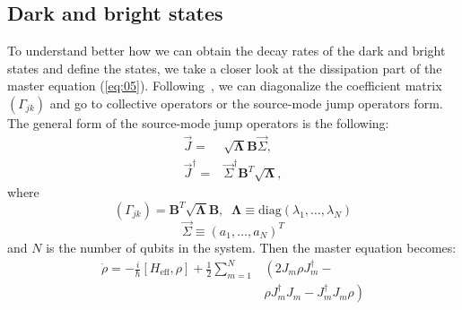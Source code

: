 \documentclass[lettersize,journal]{IEEEtran}
\begin{document}
\subsection{Dark and bright states}

To understand better how we can obtain the decay rates of the dark and bright states and define the states, we take a closer look at the dissipation part of the master equation (\ref{eq:05}).
Following~\cite{gross1982superradiance, carmichael_quantum_2000, clemens_collective_2003}, we can diagonalize the coefficient matrix $(\Gamma_{jk})$ and go to collective operators or the source-mode jump operators form.
The general form of the source-mode jump operators is the following:
\begin{align}\label{eq:07}
    \vec{J} =& \sqrt{\mathbf{\Lambda}} \mathbf{B} \vec{\Sigma},\\
    \vec{J}^\dag =& \vec{\Sigma}^\dag \mathbf{B}^T \sqrt{\mathbf{\Lambda}},
\end{align}
where 
\begin{equation} \label{eq:08}
    \left( \Gamma_{jk} \right) = \mathbf{B}^T \sqrt{\mathbf{\Lambda}} \mathbf{B}, \;\; \mathbf{\Lambda} \equiv \mathrm{diag}(\lambda_1, \ldots, \lambda_N)
\end{equation}
\begin{equation} \label{eq:09}
    \vec{\Sigma} \equiv \left( a_1, \ldots, a_N \right)^T
\end{equation}
and $N$ is the number of qubits in the system.
Then the master equation becomes:
\begin{equation} \label{eq:10}
    \begin{aligned}
        \dot{\rho} = -\frac{i}{\hbar} \left[H_\mathrm{eff}, \rho\right] + \frac{1}{2} \sum_{m=1}^N &\left( 2 J_m \rho J_m^\dag - \right.\\
        &\left.\rho J_m^\dag J_m - J_m^\dag J_m \rho \right)
    \end{aligned}
\end{equation}
\end{document}

